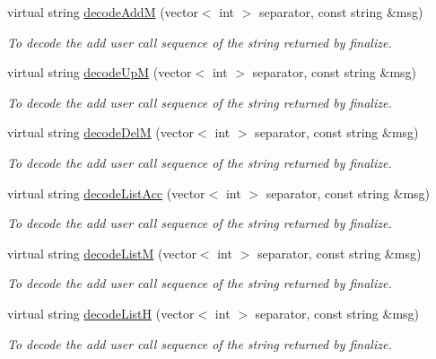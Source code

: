 \begin{DoxyCompactItemize}
virtual string \hyperlink{classUMSMapper_a8b40c596d15368717b8a62a00d80df22}{decodeAddM} (vector$<$ int $>$ separator, const string \&msg)
\begin{DoxyCompactList}\small\item\em To decode the add user call sequence of the string returned by finalize. \item\end{DoxyCompactList}\item 
virtual string \hyperlink{classUMSMapper_a11c776ef36bfe7237e920dfdd3c0c1ec}{decodeUpM} (vector$<$ int $>$ separator, const string \&msg)
\begin{DoxyCompactList}\small\item\em To decode the add user call sequence of the string returned by finalize. \item\end{DoxyCompactList}\item 
virtual string \hyperlink{classUMSMapper_a8b218eb1620678b625db8444dab8226c}{decodeDelM} (vector$<$ int $>$ separator, const string \&msg)
\begin{DoxyCompactList}\small\item\em To decode the add user call sequence of the string returned by finalize. \item\end{DoxyCompactList}\item 
virtual string \hyperlink{classUMSMapper_aca69a6e37499b1e2536521048ff40403}{decodeListAcc} (vector$<$ int $>$ separator, const string \&msg)
\begin{DoxyCompactList}\small\item\em To decode the add user call sequence of the string returned by finalize. \item\end{DoxyCompactList}\item 
virtual string \hyperlink{classUMSMapper_af1a5337f43f288ba2f922f9876b8e0f8}{decodeListM} (vector$<$ int $>$ separator, const string \&msg)
\begin{DoxyCompactList}\small\item\em To decode the add user call sequence of the string returned by finalize. \item\end{DoxyCompactList}\item 
virtual string \hyperlink{classUMSMapper_a54ef53fc918cfacdeda213fafdcc76de}{decodeListH} (vector$<$ int $>$ separator, const string \&msg)
\begin{DoxyCompactList}\small\item\em To decode the add user call sequence of the string returned by finalize. \item\end{DoxyCompactList}\item 

\end{DoxyCompactItemize}
